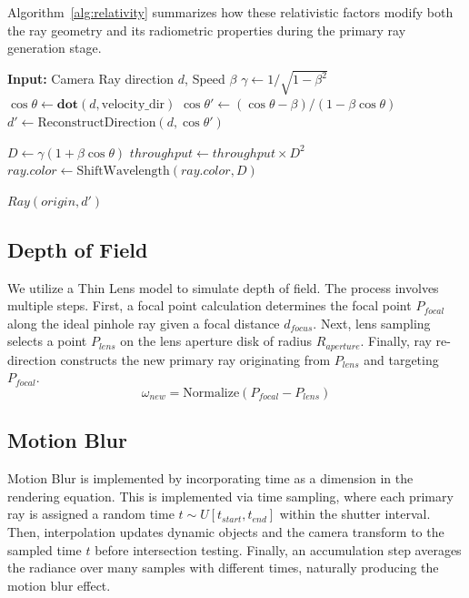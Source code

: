\documentclass[sigconf]{acmart}
\begin{document}
Algorithm~\ref{alg:relativity} summarizes how these relativistic factors modify both the ray geometry and its radiometric properties during the primary ray generation stage.

\begin{algorithm}[H]
\caption{Relativistic Ray Generation}
\begin{algorithmic}[1]
\State \textbf{Input:} Camera Ray direction $d$, Speed $\beta$
\State $\gamma \gets 1 / \sqrt{1 - \beta^2}$
\State $\cos\theta \gets \mathbf{dot}(d, \text{velocity\_dir})$
\State {}
\State $\cos\theta' \gets (\cos\theta - \beta) / (1 - \beta \cos\theta)$
\State $d' \gets \text{ReconstructDirection}(d, \cos\theta')$ 

\State {}
\State $D \gets \gamma (1 + \beta \cos\theta)$
\State $throughput \gets throughput \times D^2$ 
\State $ray.color \gets \text{ShiftWavelength}(ray.color, D)$

\State \Return $Ray(origin, d')$
\end{algorithmic}
\label{alg:relativity}
\end{algorithm}

\subsection{Depth of Field}
We utilize a Thin Lens model to simulate depth of field. The process involves multiple steps.
First, a focal point calculation determines the focal point $P_{focal}$ along the ideal pinhole ray given a focal distance $d_{focus}$.
Next, lens sampling selects a point $P_{lens}$ on the lens aperture disk of radius $R_{aperture}$.
Finally, ray re-direction constructs the new primary ray originating from $P_{lens}$ and targeting $P_{focal}$.
\begin{equation}
\omega_{new} = \text{Normalize}(P_{focal} - P_{lens})
\end{equation}

\subsection{Motion Blur}
Motion Blur is implemented by incorporating time as a dimension in the rendering equation.
This is implemented via time sampling, where each primary ray is assigned a random time $t \sim U[t_{start}, t_{end}]$ within the shutter interval.
Then, interpolation updates dynamic objects and the camera transform to the sampled time $t$ before intersection testing.
Finally, an accumulation step averages the radiance over many samples with different times, naturally producing the motion blur effect.
\end{document}
